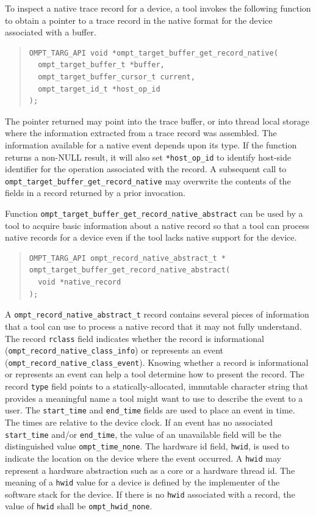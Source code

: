 \documentclass{article}
\begin{document}
To inspect a native trace record for a device, a tool invokes the following function to obtain a pointer to a trace record in the native format for the device associated with a buffer. \begin{quote}
\begin{lstlisting}
OMPT_TARG_API void *ompt_target_buffer_get_record_native(
  ompt_target_buffer_t *buffer, 
  ompt_target_buffer_cursor_t current,
  ompt_target_id_t *host_op_id
);
\end{lstlisting}
\end{quote}
The pointer returned  may point into the trace buffer, or into thread local storage where the information extracted from a trace record was assembled. The information available for a native event depends upon its type. If the function returns a non-NULL result, it will also set \lstinline|*host_op_id| to identify host-side identifier for the operation associated with the record.
A subsequent call to \lstinline|ompt_target_buffer_get_record_native| may overwrite the contents of the fields in a record returned by a prior invocation.

Function  \lstinline|ompt_target_buffer_get_record_native_abstract| can be
used by a tool to acquire basic information about a native record 
so that a tool can process native records for a device even if the
tool lacks native support for the device. 
\begin{quote}
\begin{lstlisting}
OMPT_TARG_API ompt_record_native_abstract_t *
ompt_target_buffer_get_record_native_abstract(
  void *native_record 
);

\end{lstlisting}
\end{quote}
A  \lstinline|ompt_record_native_abstract_t| record contains several pieces of information that a tool can use to process a native record that it may not fully understand. The record \lstinline|rclass| field indicates whether the record is informational (\lstinline|ompt_record_native_class_info|) or represents an event (\lstinline|ompt_record_native_class_event|). Knowing whether a record is informational or represents an event can help a tool determine how to present the record. The record  \lstinline|type| field points to a statically-allocated, immutable character string that provides  a meaningful name  a tool might want to use to describe the event to a user. The \lstinline|start_time| and \lstinline|end_time| fields are used to place an event in time. The times are relative to the device clock. If an event has no associated \lstinline|start_time| and/or \lstinline|end_time|, the value of an unavailable field will be the distinguished value \lstinline|ompt_time_none|. The hardware id field, \lstinline|hwid|,  is used to indicate the location on the device where the event occurred. A \lstinline|hwid| may represent a hardware abstraction such as a core or a hardware thread id. The meaning of a \lstinline|hwid| value for a device is defined by the implementer of the software stack for the device. If there is no \lstinline|hwid| associated with a record, the value of \lstinline|hwid| shall be \lstinline|ompt_hwid_none|. 
\end{document}
